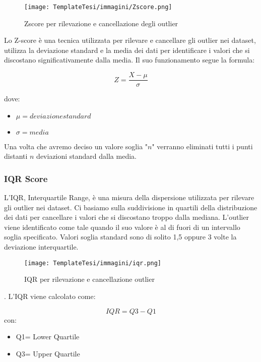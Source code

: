 \begin{flushleft}
\begin{figure}[H]
    \centering
    \texttt{[image: TemplateTesi/immagini/Zscore.png]}
    \caption{Zscore per rilevazione e cancellazione degli outlier \cite{ImmZscore}}
    \label{fig:zscore}
\end{figure}

Lo Z-score è una tecnica utilizzata per rilevare e cancellare gli outlier nei dataset, utilizza la deviazione standard e la media dei dati per identificare i valori che si discostano significativamente dalla media.
Il suo funzionamento segue la formula:

$$Z=\frac{X- \mu}{\sigma}$$
                                      
dove:
\begin{itemize}
    \item $\mu=deviazione  standard$
    \item $\sigma=media$
\end{itemize}



Una volta che avremo deciso un valore soglia "$n$" verranno eliminati tutti i punti distanti $n$ deviazioni standard dalla media.


\subsubsection{IQR Score}
L'IQR, Interquartile Range, è una misura della dispersione utilizzata per rilevare gli outlier nei dataset.
Ci basiamo sulla suddivisione in quartili della distribuzione dei dati per cancellare i valori che si discostano troppo dalla mediana.
L'outlier viene identificato come tale quando il suo valore è al di fuori di un intervallo soglia specificato.
Valori soglia standard sono di solito 1,5 oppure 3 volte la deviazione interquartile.
\begin{figure}[H]
    \centering
    \texttt{[image: TemplateTesi/immagini/iqr.png]}
    \caption{IQR per rilevazione e cancellazione outlier \cite{ImmIQR}}
    \label{fig:my_label}
\end{figure}

.
\newline
L'IQR viene calcolato come:

$$IQR=Q3-Q1$$
con:
\begin{itemize}
    \item Q1= Lower Quartile 
    \item Q3= Upper Quartile
\end{itemize}






\end{flushleft}
